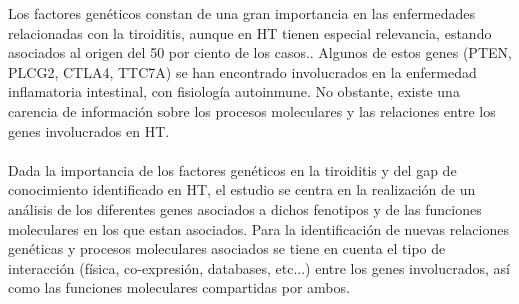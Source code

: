 Los factores genéticos constan de una gran importancia en las enfermedades relacionadas con la tiroiditis, aunque en HT tienen especial relevancia, estando asociados al origen del 50 por ciento de los casos.\cite{Zheng2020}. Algunos de estos genes (PTEN, PLCG2, CTLA4, TTC7A) se han encontrado involucrados en la enfermedad inflamatoria intestinal, con fisiología autoinmune. No obstante, existe una carencia de información sobre los procesos moleculares y las relaciones entre los genes involucrados en HT. \cite{Li2019,Tsai2022,Deppong2010}
\\ \\  
Dada la importancia de los factores genéticos en la tiroiditis y del gap de conocimiento identificado en HT, el estudio se centra en la realización de un análisis de los diferentes genes asociados a dichos fenotipos y de las funciones moleculares en los que estan asociados. Para la identificación de nuevas relaciones genéticas y procesos moleculares asociados se tiene en cuenta el tipo de interacción (física, co-expresión, databases, etc...) entre los genes involucrados, así como las funciones moleculares compartidas por ambos.









